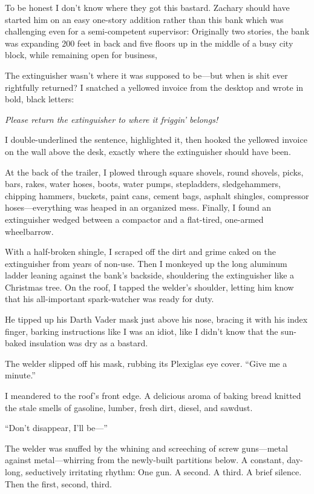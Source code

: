 To be honest I don't know where they got this bastard. Zachary should
have started him on an easy one-story addition rather than this bank
which was challenging even for a semi-competent supervisor: Originally
two stories, the bank was expanding 200 feet in back and five floors up
in the middle of a busy city block, while remaining open for business,

The extinguisher wasn't where it was supposed to be---but when is shit
ever rightfully returned? I snatched a yellowed invoice from the desktop
and wrote in bold, black letters: ~~~

\emph{Please return the extinguisher to where it friggin' belongs!}

I double-underlined the sentence, highlighted it, then hooked the
yellowed invoice on the wall above the desk, exactly where the
extinguisher should have been.

At the back of the trailer, I plowed through square shovels, round
shovels, picks, bars, rakes, water hoses, boots, water pumps,
stepladders, sledgehammers, chipping hammers, buckets, paint cans,
cement bags, asphalt shingles, compressor hoses---everything was heaped
in an organized mess. Finally, I found an extinguisher wedged between a
compactor and a flat-tired, one-armed wheelbarrow.

With a half-broken shingle, I scraped off the dirt and grime caked on
the extinguisher from years of non-use. Then I monkeyed up the long
aluminum ladder leaning against the bank's backside, shouldering the
extinguisher like a Christmas tree. On the roof, I tapped the welder's
shoulder, letting him know that his all-important spark-watcher was
ready for duty.

He tipped up his Darth Vader mask just above his nose, bracing it with
his index finger, barking instructions like I was an idiot, like I
didn't know that the sun-baked insulation was dry as a bastard.

The welder slipped off his mask, rubbing its Plexiglas eye cover. ``Give
me a minute.''

I meandered to the roof's front edge. A delicious aroma of baking bread
knitted the stale smells of gasoline, lumber, fresh dirt, diesel, and
sawdust.

``Don't disappear, I'll be---''

The welder was snuffed by the whining and screeching of screw
guns---metal against metal---whirring from the newly-built partitions
below. A constant, day-long, seductively irritating rhythm: One gun. A
second. A third. A brief silence. Then the first, second, third. ~~~~

